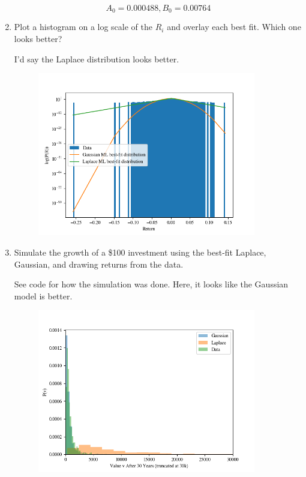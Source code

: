 \begin{enumerate}[label=\textbf{\Alph*}.]
    $$A_0=0.000488, B_0=0.00764$$

    \newpage
    \item Plot a histogram on a log scale of the $R_i$ and overlay each best fit. Which one looks better?

    I'd say the Laplace distribution looks better.
    \begin{figure}[H]
        \begin{center}
            \includegraphics[width=0.9\textwidth]{q1_return_hist.png}
        \end{center}
    \end{figure}
    \newpage
    \item Simulate the growth of a \$100 investment using the best-fit Laplace, Gaussian, and drawing returns from the data.

    See code for how the simulation was done. Here, it looks like the Gaussian model is better.
    \begin{figure}[H]
        \begin{center}
            \includegraphics[width=0.9\textwidth]{q1_generator_comparison.png}
        \end{center}
    \end{figure}

\end{enumerate}
